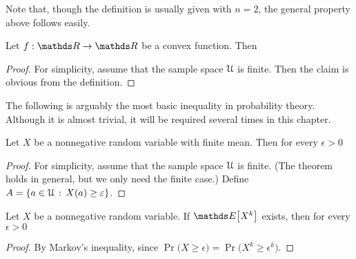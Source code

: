 \documentclass[scombinatorics.tex]{subfiles}
\begin{document}
Note that, though the definition is usually given with $n=2$, the general property above follows easily.

\begin{void_thm}\label{Jensen}
Let $f:\RR\to\RR$ be a convex function.
  Then

  {\le}
  {\Ex\Big[f(X)\Big]}
\end{void_thm}


\begin{proof}
  For simplicity, assume that the sample space $\EuScript U$ is finite.
  Then the claim is obvious from the definition.
\end{proof}

The following is arguably the most basic inequality in probability theory.
Although it is almost trivial, it will be required several times in this chapter. 

\begin{void_thm}\label{Markov}
  Let $X$ be a nonnegative random variable with finite mean.
  Then for every $\epsilon>0$

  {\le}
  {\frac{\Ex[X]}{\epsilon}}
\end{void_thm}

\begin{proof}
  For simplicity, assume that the sample space $\EuScript U$ is finite.
  (The theorem holds in general, but we only need the finite case.)
  Define $A=\{a\in\EuScript U\,:\, X(a)\ge\varepsilon\}$.





\end{proof}

\begin{corollary}
  Let $X$ be a nonnegative random variable.
  If $\Ex\big[X^k\big]$ exists, then for every $\epsilon>0$
  
  {\le}
  {}
\end{corollary}

\begin{proof}
  By Markov's inequality, since $\Pr\big(X\ge\epsilon\big)=\Pr\big(X^k\ge\epsilon^k\big)$.
\end{proof}
\end{document}

